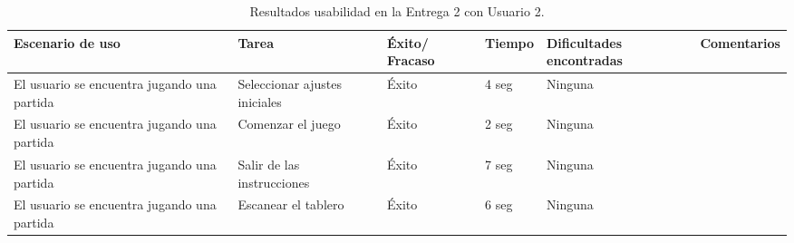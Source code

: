 \begin{table}[h]
  \begin{center}
    \begin{tabular}{|p{2.5cm}|p{1.75cm}|p{1.25cm}|p{1.25cm}|p{2.75cm}|p{3.5cm}|}

      \hline
        \rowcolor{Gray} \textbf{Escenario de uso}
        & \textbf{Tarea}
        & \textbf{Éxito/ Fracaso}
        & \textbf{Tiempo}
        & \textbf{Dificultades encontradas}
        & \textbf{Comentarios}\\

      \hline
      El usuario se encuentra jugando una partida
      & Seleccionar ajustes iniciales
      & Éxito
      & 4 seg
      & Ninguna
      &\\

      \hline
      El usuario se encuentra jugando una partida
      & Comenzar el juego
      & Éxito
      & 2 seg
      & Ninguna
      &\\

      \hline
      El usuario se encuentra jugando una partida
      & Salir de las instrucciones
      & Éxito
      & 7 seg
      & Ninguna
      &\\

      \hline
      El usuario se encuentra jugando una partida
      & Escanear el tablero
      & Éxito
      & 6 seg
      & Ninguna
      &\\

      \hline

    \end{tabular}

    \caption{Resultados usabilidad en la Entrega 2 con Usuario 2.}
    \label{tabla-entrega-2-usuario2}

  \end{center}
\end{table}


